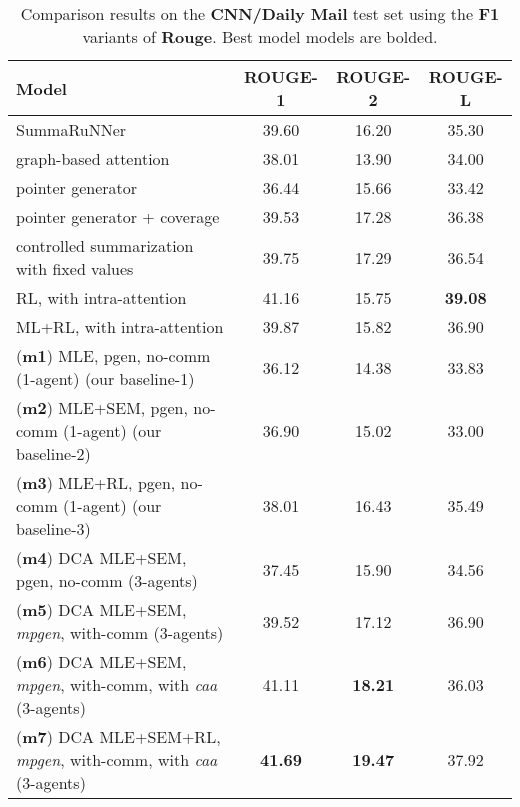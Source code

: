 \documentclass[11pt,a4paper]{article}
\begin{document}
\begin{table*}[ht]
	\small
    \centering
    \begin{tabular}{|l | c | c | c |}
         \hline
         Model & ROUGE-1 & ROUGE-2 & ROUGE-L \\
         \hline
         SummaRuNNer \cite{summs2s} & 39.60 &  16.20 & 35.30 \\
         graph-based attention \cite{graphbased} & 38.01 & 13.90 & 34.00 \\
         pointer generator \cite{summpoinernet} & 36.44 & 15.66 & 33.42 \\
         pointer generator + coverage \cite{summpoinernet} & 39.53  & 17.28 & 36.38 \\
         controlled summarization with fixed values \cite{controllable} & 39.75 & 17.29 & 36.54 \\
         RL, with intra-attention \cite{rlsummsocher} & 41.16 & 15.75 & \textbf{39.08} \\
         ML+RL, with intra-attention\cite{rlsummsocher} & 39.87 & 15.82 & 36.90 \\
         \hline
         (\textbf{m1}) MLE, pgen, no-comm (1-agent) (our baseline-1) & 36.12& 14.38& 33.83\\
         (\textbf{m2}) MLE+SEM, pgen, no-comm (1-agent) (our baseline-2) & 36.90 & 15.02& 33.00 \\
         (\textbf{m3}) MLE+RL, pgen, no-comm (1-agent) (our baseline-3) & 38.01& 16.43& 35.49\\
         \hline
         (\textbf{m4}) DCA MLE+SEM, pgen, no-comm (3-agents) & 37.45& 15.90& 34.56\\
         (\textbf{m5}) DCA MLE+SEM, \textit{mpgen}, with-comm (3-agents) & 39.52 & 17.12 & 36.90 \\
         (\textbf{m6}) DCA MLE+SEM, \textit{mpgen}, with-comm, with \textit{caa} (3-agents) & 41.11  & \textbf{18.21}& 36.03\\
         (\textbf{m7}) DCA MLE+SEM+RL, \textit{mpgen}, with-comm, with \textit{caa} (3-agents) & \textbf{41.69} & \textbf{19.47} & 37.92 \\     
         \hline
    \end{tabular}
    \vspace{-0.05in}
    \caption{Comparison results on the \textbf{CNN/Daily Mail} test set using the \textbf{F1} variants of \textbf{Rouge}. Best model models are bolded.}
    \label{tab:summ1}
\end{table*}
\end{document}
